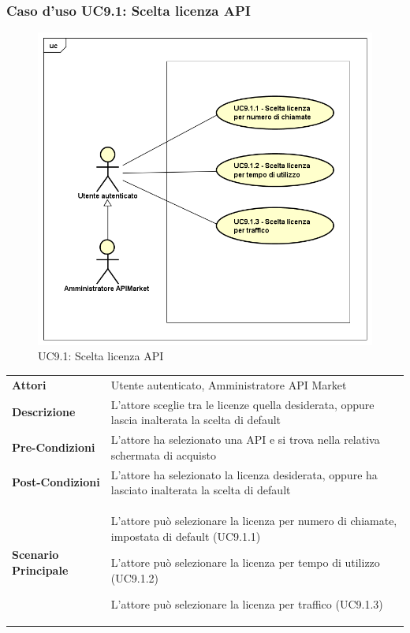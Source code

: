 \subsubsection{Caso d'uso UC9.1: Scelta licenza API}
\label{UC9_1}
\begin{figure}[ht]
	\centering
	\includegraphics[scale=0.45]{UML/UC9_1.png}
	\caption{UC9.1: Scelta licenza API}
\end{figure}

\begin{minipage}{\linewidth}
	\begin{tabular}{ l | p{11cm}}
		\hline
		\rowcolor{Gray}
		\multicolumn{2}{c}{UC9.1 - Visualizzazione menù licenza} \\
		\hline
		\textbf{Attori} & Utente autenticato, Amministratore API Market \\
		\textbf{Descrizione} & L'attore sceglie tra le licenze quella desiderata, oppure lascia inalterata la scelta di default \\
		\textbf{Pre-Condizioni} & L'attore ha selezionato una API e si trova nella relativa schermata di acquisto \\
		\textbf{Post-Condizioni} & L'attore ha selezionato la licenza desiderata, oppure ha lasciato inalterata la scelta di default \\
		\textbf{Scenario Principale} & 
		\begin{enumerate*}[label=(\arabic*.),itemjoin={\newline}]
			\item L'attore può selezionare la licenza per numero di chiamate, impostata di default (UC9.1.1)
			\item L'attore può selezionare la licenza per tempo di utilizzo (UC9.1.2)
			\item L'attore può selezionare la licenza per traffico (UC9.1.3)
		\end{enumerate*}\\
	\end{tabular}
\end{minipage}

